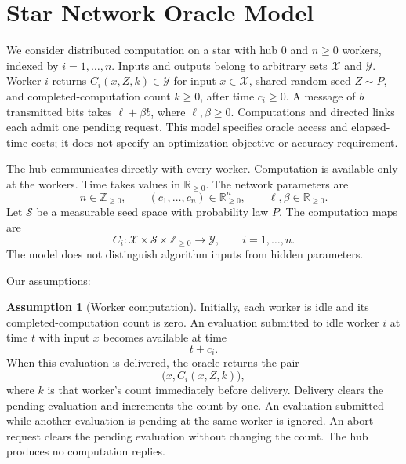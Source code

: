 \documentclass[10pt]{article}
\theoremstyle{definition}
\newtheorem{assumption}{Assumption}
\begin{document}
\section*{Star Network Oracle Model}
We consider distributed computation on a star with hub $0$ and $n\geq 0$ workers, indexed by $i=1,\ldots,n$. Inputs and outputs belong to arbitrary sets $\mathcal{X}$ and $\mathcal{Y}$. Worker $i$ returns $C_i(x,Z,k)\in\mathcal{Y}$ for input $x\in\mathcal{X}$, shared random seed $Z\sim P$, and completed-computation count $k\geq 0$, after time $c_i\geq 0$. A message of $b$ transmitted bits takes $\ell+\beta b$, where $\ell,\beta\geq 0$. Computations and directed links each admit one pending request. This model specifies oracle access and elapsed-time costs; it does not specify an optimization objective or accuracy requirement.

The hub communicates directly with every worker. Computation is available only at the workers. Time takes values in $\mathbb{R}_{\geq 0}$. The network parameters are
\[
n\in\mathbb{Z}_{\geq 0},\qquad
(c_1,\ldots,c_n)\in\mathbb{R}_{\geq 0}^{n},\qquad
\ell,\beta\in\mathbb{R}_{\geq 0}.
\]
Let $\mathcal{S}$ be a measurable seed space with probability law $P$. The computation maps are
\[
C_i:\mathcal{X}\times\mathcal{S}\times\mathbb{Z}_{\geq 0}
\longrightarrow\mathcal{Y},
\qquad i=1,\ldots,n.
\]
The model does not distinguish algorithm inputs from hidden parameters.

Our assumptions:
\begin{assumption}[Worker computation]
Initially, each worker is idle and its completed-computation count is zero. An evaluation submitted to idle worker $i$ at time $t$ with input $x$ becomes available at time
\[
t+c_i.
\]
When this evaluation is delivered, the oracle returns the pair
\[
\bigl(x,C_i(x,Z,k)\bigr),
\]
where $k$ is that worker's count immediately before delivery. Delivery clears the pending evaluation and increments the count by one. An evaluation submitted while another evaluation is pending at the same worker is ignored. An abort request clears the pending evaluation without changing the count. The hub produces no computation replies.
\end{assumption}
\end{document}
